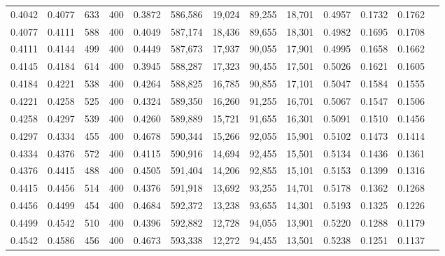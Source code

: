 \begin{tabular}{rrrrrrrrrrrrr}
0.4042 & 0.4077 &    633 & 400 &                                     0.3872 & 586,586 &  19,024 &  89,255 &  18,701 & 0.4957 & 0.1732 & 0.1762 \\
0.4077 & 0.4111 &    588 & 400 &                                     0.4049 & 587,174 &  18,436 &  89,655 &  18,301 & 0.4982 & 0.1695 & 0.1708 \\
0.4111 & 0.4144 &    499 & 400 &                                     0.4449 & 587,673 &  17,937 &  90,055 &  17,901 & 0.4995 & 0.1658 & 0.1662 \\
0.4145 & 0.4184 &    614 & 400 &                                     0.3945 & 588,287 &  17,323 &  90,455 &  17,501 & 0.5026 & 0.1621 & 0.1605 \\
0.4184 & 0.4221 &    538 & 400 &                                     0.4264 & 588,825 &  16,785 &  90,855 &  17,101 & 0.5047 & 0.1584 & 0.1555 \\
0.4221 & 0.4258 &    525 & 400 &                                     0.4324 & 589,350 &  16,260 &  91,255 &  16,701 & 0.5067 & 0.1547 & 0.1506 \\
0.4258 & 0.4297 &    539 & 400 &                                     0.4260 & 589,889 &  15,721 &  91,655 &  16,301 & 0.5091 & 0.1510 & 0.1456 \\
0.4297 & 0.4334 &    455 & 400 &                                     0.4678 & 590,344 &  15,266 &  92,055 &  15,901 & 0.5102 & 0.1473 & 0.1414 \\
0.4334 & 0.4376 &    572 & 400 &                                     0.4115 & 590,916 &  14,694 &  92,455 &  15,501 & 0.5134 & 0.1436 & 0.1361 \\
0.4376 & 0.4415 &    488 & 400 &                                     0.4505 & 591,404 &  14,206 &  92,855 &  15,101 & 0.5153 & 0.1399 & 0.1316 \\
0.4415 & 0.4456 &    514 & 400 &                                     0.4376 & 591,918 &  13,692 &  93,255 &  14,701 & 0.5178 & 0.1362 & 0.1268 \\
0.4456 & 0.4499 &    454 & 400 &                                     0.4684 & 592,372 &  13,238 &  93,655 &  14,301 & 0.5193 & 0.1325 & 0.1226 \\
0.4499 & 0.4542 &    510 & 400 &                                     0.4396 & 592,882 &  12,728 &  94,055 &  13,901 & 0.5220 & 0.1288 & 0.1179 \\
0.4542 & 0.4586 &    456 & 400 &                                     0.4673 & 593,338 &  12,272 &  94,455 &  13,501 & 0.5238 & 0.1251 & 0.1137 \\

\end{tabular}
